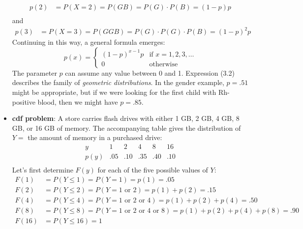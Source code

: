 \documentclass{report}
\begin{document}
\begin{itemize}
\[\begin{aligned}
                    p(2) &= P(X = 2) = P(GB) = P(G) \cdot P(B) = (1 - p)p \\
                \end{aligned}
            \]
            and
            \[
                \begin{aligned}
                    p(3) &= P(X = 3) = P(GGB) = P(G) \cdot P(G) \cdot P(B) = (1 - p)^2 p
                \end{aligned}
            \]
            Continuing in this way, a general formula emerges:
            \[
                p(x) = 
                \begin{cases} 
                    (1 - p)^{x-1} p & \text{if } x = 1, 2, 3, \ldots \\
                    0 & \text{otherwise}
                \end{cases}
            \]
            The parameter \( p \) can assume any value between 0 and 1. Expression (3.2) describes the family of \textit{geometric distributions}. In the gender example, \( p = .51 \) might be appropriate, but if we were looking for the first child with Rh-positive blood, then we might have \( p = .85 \).
        \item \textbf{cdf problem}:
            A store carries flash drives with either 1 GB, 2 GB, 4 GB, 8 GB, or 16 GB of memory. The accompanying table gives the distribution of \( Y = \) the amount of memory in a purchased drive:
            \[
                \begin{array}{c|ccccc}
                    y & 1 & 2 & 4 & 8 & 16 \\
                    \hline
                    p(y) & .05 & .10 & .35 & .40 & .10 \\
                \end{array}
            \]
            Let's first determine \( F(y) \) for each of the five possible values of \( Y \):
            \[
                \begin{aligned}
                    F(1) &= P(Y \leq 1) = P(Y = 1) = p(1) = .05 \\
                    F(2) &= P(Y \leq 2) = P(Y = 1 \text{ or } 2) = p(1) + p(2) = .15 \\
                    F(4) &= P(Y \leq 4) = P(Y = 1 \text{ or } 2 \text{ or } 4) = p(1) + p(2) + p(4) = .50 \\
                    F(8) &= P(Y \leq 8) = P(Y = 1 \text{ or } 2 \text{ or } 4 \text{ or } 8) = p(1) + p(2) + p(4) + p(8) = .90 \\
                    F(16) &= P(Y \leq 16) = 1 \\

\end{aligned}\]
\end{itemize}
\end{document}
